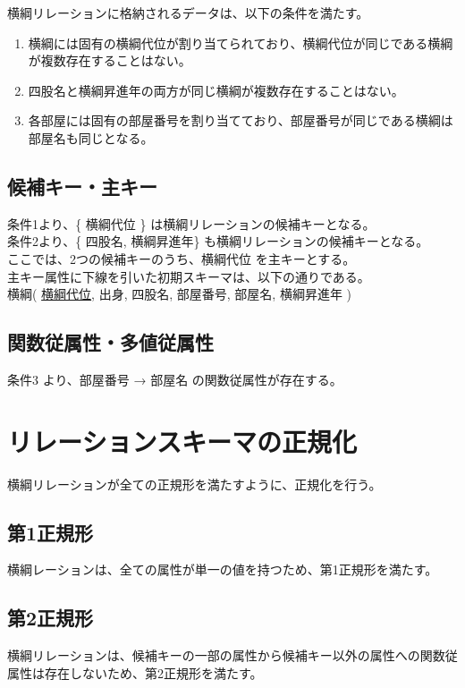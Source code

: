 \documentclass[10pt,a4paper,titlepage]{jreport}
\begin{document}
横綱リレーションに格納されるデータは、以下の条件を満たす。

\begin{enumerate}
\item 横綱には固有の横綱代位が割り当てられており、横綱代位が同じである横綱が複数存在することはない。
\item 四股名と横綱昇進年の両方が同じ横綱が複数存在することはない。
\item 各部屋には固有の部屋番号を割り当てており、部屋番号が同じである横綱は部屋名も同じとなる。
\end{enumerate}


\subsection{候補キー・主キー}
条件1より、\{ 横綱代位 \} は横綱リレーションの候補キーとなる。\\
条件2より、\{ 四股名, 横綱昇進年\} も横綱リレーションの候補キーとなる。\\
ここでは、2つの候補キーのうち、横綱代位 を主キーとする。\\
主キー属性に下線を引いた初期スキーマは、以下の通りである。\\

横綱( \underline{横綱代位}, 出身, 四股名, 部屋番号, 部屋名, 横綱昇進年 )


\subsection{関数従属性・多値従属性}
条件3 より、部屋番号 → 部屋名 の関数従属性が存在する。\\

\section{リレーションスキーマの正規化}
横綱リレーションが全ての正規形を満たすように、正規化を行う。


\subsection{第1正規形}
横綱レーションは、全ての属性が単一の値を持つため、第1正規形を満たす。\\


\subsection{第2正規形}
横綱リレーションは、候補キーの一部の属性から候補キー以外の属性への関数従属性は存在しないため、第2正規形を満たす。\\
\end{document}
